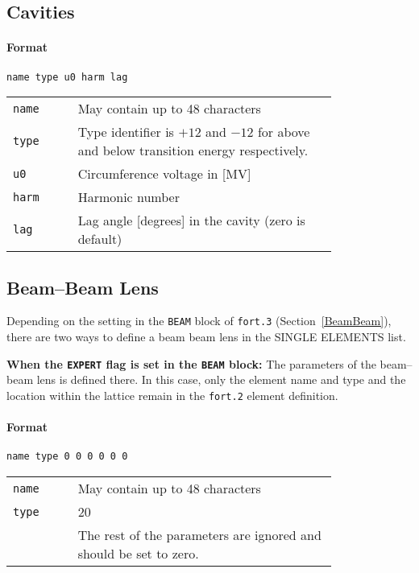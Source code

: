 \subsection{Cavities} \label{Cavities}

\paragraph{Format} \texttt{name type u0 harm lag}

\bigskip
\begin{tabular}{@{}lp{0.8\linewidth}}
    \texttt{name} & May contain up to 48 characters \\
    \texttt{type} & Type identifier is $+12$ and $-12$ for above and below transition energy respectively. \\
    \texttt{u0}   & Circumference voltage in [MV] \\
    \texttt{harm} & Harmonic number \\
    \texttt{lag}  & Lag angle [degrees] in the cavity (zero is default)
\end{tabular}

\subsection{Beam--Beam Lens} \label{BBS}

Depending on the setting in the \texttt{BEAM} block of \texttt{fort.3} (Section~\ref{BeamBeam}), there are two ways to define a beam beam lens in the SINGLE ELEMENTS list.

\bigskip
\noindent\textbf{When the \texttt{EXPERT} flag is set in the \texttt{BEAM} block:}
The parameters of the beam--beam lens is defined there.
In this case, only the element name and type and the location within the lattice remain in the \texttt{fort.2} element definition.

\paragraph{Format} \texttt{name type 0 0 0 0 0 0}

\bigskip
\begin{tabular}{@{}lp{0.8\linewidth}}
    \texttt{name} & May contain up to 48 characters \\
    \texttt{type} & 20 \\
    \texttt{}     & The rest of the parameters are ignored and should be set to zero.
\end{tabular}

